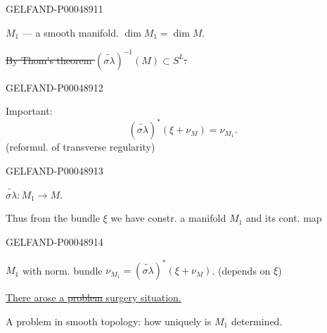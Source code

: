 \begin{GelfandAdjacentEvidence}{GELFAND-P000489}{11}

$M_1$ — a smooth manifold. $\dim M_1=\dim M$.

\sout{By Thom’s theorem \mbox{$(\widetilde{\sigma\lambda})^{-1}(M)\subset S^L$}.}
\end{GelfandAdjacentEvidence}
\begin{GelfandAdjacentEvidence}{GELFAND-P000489}{12}


Important:
\[
\boxed{(\widetilde{\sigma\lambda})^*(\xi+\nu_M)=\nu_{M_1}.}
\]
(reformul. of transverse regularity)
\end{GelfandAdjacentEvidence}
\begin{GelfandAdjacentEvidence}{GELFAND-P000489}{13}


$\widetilde{\sigma\lambda}:M_1\longrightarrow M$.

Thus from the bundle $\xi$ we have constr. a manifold $M_1$ and its cont. map
\end{GelfandAdjacentEvidence}
\begin{GelfandAdjacentEvidence}{GELFAND-P000489}{14}


$M_1$ with norm. bundle
$\nu_{M_1}=(\widetilde{\sigma\lambda})^*(\xi+\nu_M)$.
(depends on $\xi$)

\uline{There arose a \mbox{\sout{problem}} surgery situation.}
\end{GelfandAdjacentEvidence}


A problem in smooth topology:
how uniquely is $M_1$ determined.



